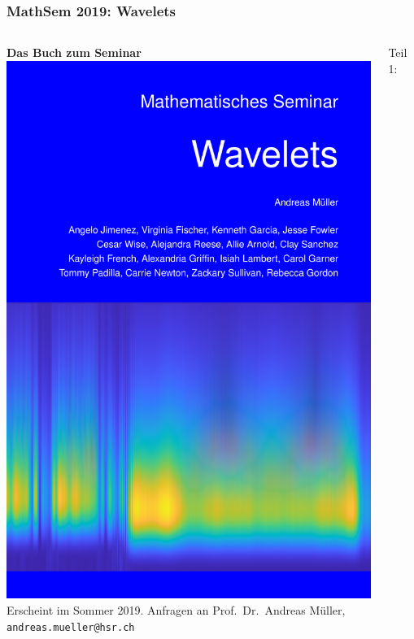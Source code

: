 \documentclass[handout]{beamer}
\title[]{}
\begin{document}
\begin{frame}
\frametitle{MathSem 2019: Wavelets}
\begin{columns}[onlytextwidth]
\begin{column}{0.32\textwidth}
{\bf\large Das Buch zum Seminar}
\bigskip
\vskip 1cm
\includegraphics[width=\hsize]{cover-medium.png}
\vskip 0.2cm
Erscheint im Sommer 2019.
Anfragen an
Prof.~Dr.~Andreas Müller,
{\texttt{andreas.mueller@hsr.ch}}
\end{column}
\begin{column}{0.63\textwidth}
\begin{description}
\item[Teil 1:] Grundlagen
\begin{enumerate}
\item 
\item 

\end{enumerate}
\end{description}
\end{column}
\end{columns}
\end{frame}
\end{document}
